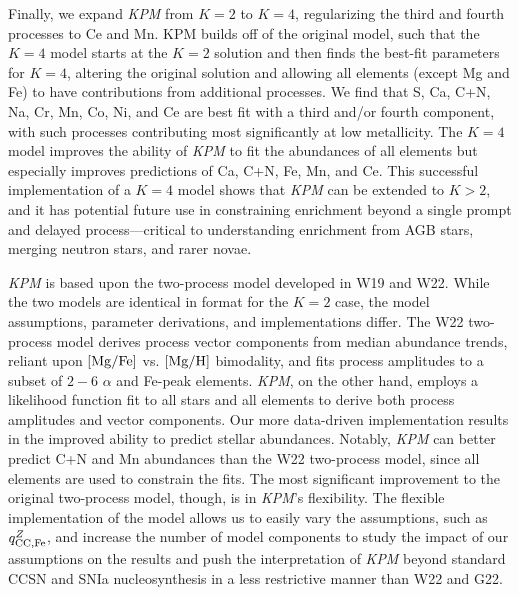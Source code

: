 \documentclass[modern]{aastex631}
\newcommand{\mgfe}[0]{[{\rm Mg/Fe}]}
\newcommand{\mgh}{[{\rm Mg}/{\rm H}]}
\newcommand{\qccFe}{q_{{\rm CC, Fe}}^{Z}}
\newcommand{\name}{\textsl{KPM}}
\begin{document}
Finally, we expand \name{} from $K=2$ to $K=4$, regularizing the third and fourth processes to Ce and Mn. KPM builds off of the original model, such that the $K=4$ model starts at the $K=2$ solution and then finds the best-fit parameters for $K=4$, altering the original solution and allowing all elements (except Mg and Fe) to have contributions from additional processes. We find that S, Ca, C+N, Na, Cr, Mn, Co, Ni, and Ce are best fit with a third and/or fourth component, with such processes contributing most significantly at low metallicity. The $K=4$ model improves the ability of \name{} to fit the abundances of all elements but especially improves predictions of Ca, C+N, Fe, Mn, and Ce. This successful implementation of a $K=4$ model shows that \name{} can be extended to $K>2$, and it has potential future use in constraining enrichment beyond a single prompt and delayed process---critical to understanding enrichment from AGB stars, merging neutron stars, and rarer novae.

\name{} is based upon the two-process model developed in W19 and W22. While the two models are identical in format for the $K=2$ case, the model assumptions, parameter derivations, and implementations differ. The W22 two-process model derives process vector components from median abundance trends, reliant upon $\mgfe$ vs. $\mgh$ bimodality, and fits process amplitudes to a subset of $2-6$ $\alpha$ and Fe-peak elements. \name{}, on the other hand, employs a likelihood function fit to all stars and all elements to derive both process amplitudes and vector components. Our more data-driven implementation results in the improved ability to predict stellar abundances. Notably, \name{} can better predict C+N and Mn abundances than the W22 two-process model, since all elements are used to constrain the fits. The most significant improvement to the original two-process model, though, is in \name{}'s flexibility. The flexible implementation of the model allows us to easily vary the assumptions, such as $\qccFe$, and increase the number of model components to study the impact of our assumptions on the results and push the interpretation of \name{} beyond standard CCSN and SNIa nucleosynthesis in a less restrictive manner than W22 and G22. 
\end{document}
